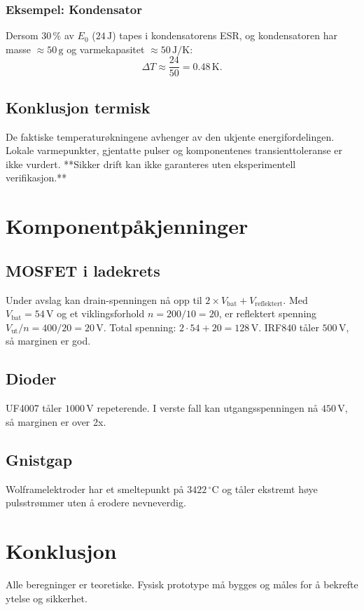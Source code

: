 \documentclass{article}
\begin{document}
\subsubsection{Eksempel: Kondensator}
Dersom 30\,\% av $E_0$ ($24\,\text{J}$) tapes i kondensatorens ESR, og kondensatoren har masse $\approx 50\,\text{g}$ og varmekapasitet $\approx 50\,\text{J/K}$:
\begin{equation}
\Delta T \approx \frac{24}{50} = 0.48\,\text{K}.
\end{equation}

\subsection{Konklusjon termisk}
De faktiske temperaturøkningene avhenger av den ukjente energifordelingen. Lokale varmepunkter, gjentatte pulser og komponentenes transienttoleranse er ikke vurdert. **Sikker drift kan ikke garanteres uten eksperimentell verifikasjon.**

\section{Komponentpåkjenninger}

\subsection{MOSFET i ladekrets}
Under avslag kan drain-spenningen nå opp til $2 \times V_{\text{bat}} + V_{\text{reflektert}}$. Med $V_{\text{bat}} = 54\,\text{V}$ og et viklingsforhold $n = 200/10 = 20$, er reflektert spenning $V_{\text{ut}}/n = 400/20 = 20\,\text{V}$. Total spenning: $2 \cdot 54 + 20 = 128\,\text{V}$. IRF840 tåler $500\,\text{V}$, så marginen er god.

\subsection{Dioder}
UF4007 tåler $1000\,\text{V}$ repeterende. I verste fall kan utgangsspenningen nå $450\,\text{V}$, så marginen er over 2x.

\subsection{Gnistgap}
Wolframelektroder har et smeltepunkt på $3422\,^{\circ}\text{C}$ og tåler ekstremt høye pulsstrømmer uten å erodere nevneverdig.

\section{Konklusjon}
Alle beregninger er teoretiske. Fysisk prototype må bygges og måles for å bekrefte ytelse og sikkerhet.
\end{document}
